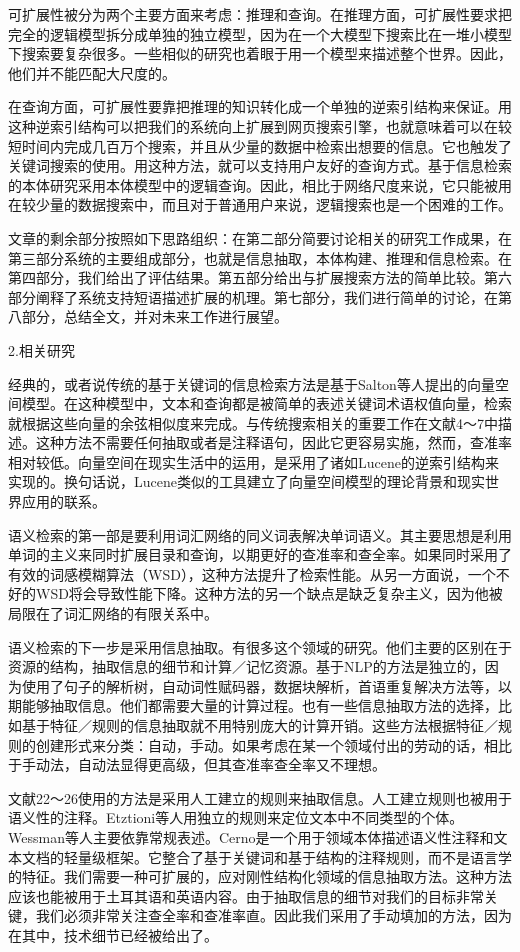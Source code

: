 可扩展性被分为两个主要方面来考虑：推理和查询。在推理方面，可扩展性要求把完全的逻辑模型拆分成单独的独立模型，因为在一个大模型下搜索比在一堆小模型下搜索要复杂很多。一些相似的研究也着眼于用一个模型来描述整个世界。因此，他们并不能匹配大尺度的。

在查询方面，可扩展性要靠把推理的知识转化成一个单独的逆索引结构来保证。用这种逆索引结构可以把我们的系统向上扩展到网页搜索引擎，也就意味着可以在较短时间内完成几百万个搜索，并且从少量的数据中检索出想要的信息。它也触发了关键词搜索的使用。用这种方法，就可以支持用户友好的查询方式。基于信息检索的本体研究采用本体模型中的逻辑查询。因此，相比于网络尺度来说，它只能被用在较少量的数据搜索中，而且对于普通用户来说，逻辑搜索也是一个困难的工作。

文章的剩余部分按照如下思路组织：在第二部分简要讨论相关的研究工作成果，在第三部分系统的主要组成部分，也就是信息抽取，本体构建、推理和信息检索。在第四部分，我们给出了评估结果。第五部分给出与扩展搜索方法的简单比较。第六部分阐释了系统支持短语描述扩展的机理。第七部分，我们进行简单的讨论，在第八部分，总结全文，并对未来工作进行展望。

2.相关研究

经典的，或者说传统的基于关键词的信息检索方法是基于{\Times Salton}等人提出的向量空间模型。在这种模型中，文本和查询都是被简单的表述关键词术语权值向量，检索就根据这些向量的余弦相似度来完成。与传统搜索相关的重要工作在文献4～7中描述。这种方法不需要任何抽取或者是注释语句，因此它更容易实施，然而，查准率相对较低。向量空间在现实生活中的运用，是采用了诸如{\Times Lucene}的逆索引结构来实现的。换句话说，{\Times Lucene}类似的工具建立了向量空间模型的理论背景和现实世界应用的联系。

语义检索的第一部是要利用词汇网络的同义词表解决单词语义。其主要思想是利用单词的主义来同时扩展目录和查询，以期更好的查准率和查全率。如果同时采用了有效的词感模糊算法（{\Times WSD}），这种方法提升了检索性能。从另一方面说，一个不好的WSD将会导致性能下降。这种方法的另一个缺点是缺乏复杂主义，因为他被局限在了词汇网络的有限关系中。

语义检索的下一步是采用信息抽取。有很多这个领域的研究。他们主要的区别在于资源的结构，抽取信息的细节和计算／记忆资源。基于{\Times NLP}的方法是独立的，因为使用了句子的解析树，自动词性赋码器，数据块解析，首语重复解决方法等，以期能够抽取信息。他们都需要大量的计算过程。也有一些信息抽取方法的选择，比如基于特征／规则的信息抽取就不用特别庞大的计算开销。这些方法根据特征／规则的创建形式来分类：自动，手动。如果考虑在某一个领域付出的劳动的话，相比于手动法，自动法显得更高级，但其查准率查全率又不理想。

文献22～26使用的方法是采用人工建立的规则来抽取信息。人工建立规则也被用于语义性的注释。{\Times Etztioni}等人用独立的规则来定位文本中不同类型的个体。{\Times Wessman}等人主要依靠常规表述。{\Times Cerno}是一个用于领域本体描述语义性注释和文本文档的轻量级框架。它整合了基于关键词和基于结构的注释规则，而不是语言学的特征。我们需要一种可扩展的，应对刚性结构化领域的信息抽取方法。这种方法应该也能被用于土耳其语和英语内容。由于抽取信息的细节对我们的目标非常关键，我们必须非常关注查全率和查准率直。因此我们采用了手动填加的方法，因为在其中，技术细节已经被给出了。

